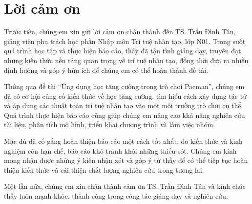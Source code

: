 \clearpage
\section*{Lời cảm ơn}

Trước tiên, chúng em xin gửi lời cảm ơn chân thành đến TS. Trần Đình Tân, giảng viên phụ trách học phần Nhập môn Trí tuệ nhân tạo, lớp N01. Trong suốt quá trình học tập và thực hiện báo cáo, thầy đã tận tình giảng dạy, truyền đạt những kiến thức nền tảng quan trọng về trí tuệ nhân tạo, đồng thời đưa ra nhiều định hướng và góp ý hữu ích để chúng em có thể hoàn thành đề tài.

Thông qua đề tài ``Ứng dụng học tăng cường trong trò chơi Pacman'', chúng em đã có cơ hội củng cố kiến thức về học tăng cường, tìm hiểu cách xây dựng tác tử và áp dụng các thuật toán trí tuệ nhân tạo vào một môi trường trò chơi cụ thể. Quá trình thực hiện báo cáo cũng giúp chúng em nâng cao khả năng nghiên cứu tài liệu, phân tích mô hình, triển khai chương trình và làm việc nhóm.

Mặc dù đã cố gắng hoàn thiện báo cáo một cách tốt nhất, do kiến thức và kinh nghiệm còn hạn chế, báo cáo khó tránh khỏi những thiếu sót. Chúng em kính mong nhận được những ý kiến nhận xét và góp ý từ thầy để có thể tiếp tục hoàn thiện kiến thức và cải thiện chất lượng nghiên cứu trong tương lai.

Một lần nữa, chúng em xin chân thành cảm ơn TS. Trần Đình Tân và kính chúc thầy luôn mạnh khỏe, thành công trong công tác giảng dạy và nghiên cứu.

\clearpage
